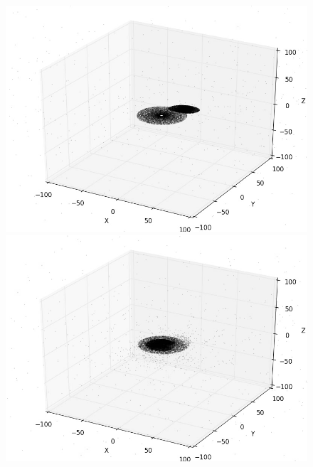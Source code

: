 \documentclass[10pt,letterpaper]{article}
\begin{document}
\begin{figure}[!htb]
  \includegraphics[width=\linewidth]{figures/galaxy_collisions/rk4_parabolic_orbit_10000_particles_clockwise_fig1.png}
  \subcaption{}\label{fig:rk4_parabolic_orbit_10000_particles_clockwise_fig1}
\endminipage\hfill
{}
  \includegraphics[width=\linewidth]{figures/galaxy_collisions/rk4_parabolic_orbit_10000_particles_clockwise_fig2.png}
  \subcaption{}\label{fig:rk4_parabolic_orbit_10000_particles_clockwise_fig2}
\endminipage\hfill
{}%

\end{figure}
\end{document}
